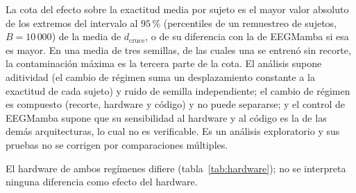 La cota del efecto sobre la exactitud media por sujeto es el mayor valor absoluto de los
extremos del intervalo al $95$\,\% (percentiles de un remuestreo de sujetos, $B = 10\,000$) de
la media de $d_{\mathrm{cruce}}$, o de su diferencia con la de EEGMamba si esa es mayor. En
una media de tres semillas, de las cuales una se entrenó sin recorte, la contaminación
máxima es la tercera parte de la cota. El análisis supone aditividad (el cambio de régimen
suma un desplazamiento constante a la exactitud de cada sujeto) y ruido de semilla
independiente; el cambio de régimen es compuesto (recorte, hardware y código) y no puede
separarse; y el control de EEGMamba supone que su sensibilidad al hardware y al código es la
de las demás arquitecturas, lo cual no es verificable. Es un análisis exploratorio y sus
pruebas no se corrigen por comparaciones múltiples.

El hardware de ambos regímenes difiere (tabla~\ref{tab:hardware}); no se interpreta ninguna
diferencia como efecto del hardware.


